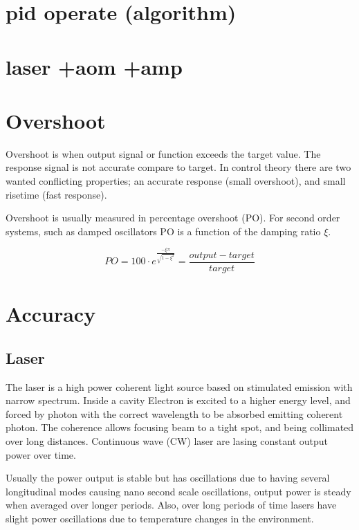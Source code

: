 \documentclass[\main/master.tex]{subfiles}
\begin{document}
\section{pid operate (algorithm)}
\section{laser +aom +amp}
\doublespacing



\section{Overshoot}
Overshoot is when output signal or function exceeds the target value. The response signal is not accurate compare to target. In control theory there are two wanted conflicting properties; an accurate response (small overshoot), and small risetime (fast response). 
\par\noindent
Overshoot is usually measured in percentage overshoot (PO). For second order systems, such as damped oscillators PO is a function of the damping ratio $\xi$. 


\begin{equation}
PO = 100\cdot e ^{\frac{-\xi\pi}{\sqrt{1-\xi^2}}} = \frac{output-target}{target}   \label{eqn:percentage_overshoot}
\end{equation}
 
\section{Accuracy}

\subsection{Laser}


The laser is a high power coherent light source based on stimulated emission with narrow spectrum. Inside a cavity Electron is excited to a higher energy level, and forced by photon with the correct wavelength to be absorbed emitting coherent photon. The coherence allows focusing beam to a tight spot, and being collimated over long distances. Continuous wave (CW) laser are lasing constant output power over time.



\par\noindent
Usually the power output is stable but has oscillations due to having several longitudinal modes causing nano second scale oscillations, output power is steady when averaged over longer periods. Also, over long periods of time lasers have slight power oscillations due to temperature changes in the environment.
\end{document}
